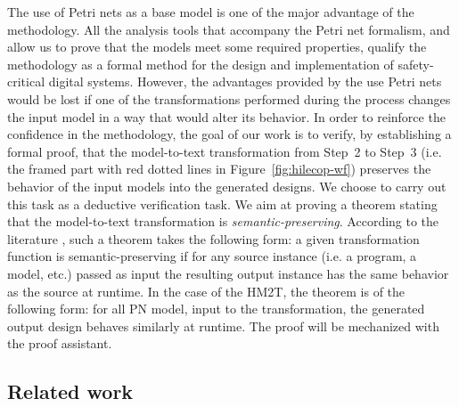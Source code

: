\documentclass[pdflatex,sn-mathphys]{sn-jnl}%
\theoremstyle{thmstyleone}%
\theoremstyle{thmstyletwo}%
\theoremstyle{thmstylethree}%
\begin{document}

The use of Petri nets as a base model is one of the major advantage of
the \hilecop{} methodology. All the analysis tools that accompany the
Petri net formalism, and allow us to prove that the models meet some
required properties, qualify the \hilecop{} methodology as a formal
method for the design and implementation of safety-critical digital
systems. However, the advantages provided by the use Petri nets would
be lost if one of the transformations performed during the process
changes the input model in a way that would alter its behavior. %
In order to reinforce the confidence in the \hilecop{} methodology,
the goal of our work is to verify, by establishing a formal proof,
that the model-to-text transformation from Step~2 to Step~3 (i.e. the
framed part with red dotted lines in Figure~\ref{fig:hilecop-wf})
preserves the behavior of the input models into the generated \vhdl{}
designs. We choose to carry out this task as a deductive verification
task.  We aim at proving a theorem stating that the \hilecop{}
model-to-text transformation is
\textit{semantic-preserving}. According to the literature
\cite{Patrignani2019,Leroy2009}, such a theorem takes the following
form: a given transformation function is semantic-preserving if for
any source instance (i.e. a program, a model, etc.) passed as input
the resulting output instance has the same behavior as the source at
runtime.  In the case of the HM2T, the theorem is of the following
form: for all PN model, input to the transformation, the generated
output \vhdl{} design behaves similarly at runtime. The proof will be
mechanized with the \coq{} proof assistant.

\subsection{Related work}
\label{sec:related-work}
\end{document}

